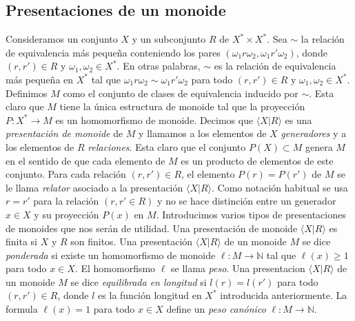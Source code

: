 \documentclass[12pt]{article}
\theoremstyle{definition}
\begin{document}
\subsection{Presentaciones de un monoide}
Consideramos un conjunto $X$ y un subconjunto $R$ de $X^*\times X^*$. Sea $\sim$ la relación de equivalencia más pequeña conteniendo los pares $(\omega_1r\omega_2, \omega_1r'\omega_2)$, donde $(r,r')\in R$ y $\omega_1,\omega_2\in X^*$. En otras palabras, $\sim$ es la relación de equivalencia más pequeña en $X^*$ tal que $\omega_1r\omega_2\sim\omega_1r'\omega_2$ para todo $(r,r')\in R$ y $\omega_1,\omega_2\in X^*$. Definimos $M$ como el conjunto de clases de equivalencia inducido por $\sim$. Esta claro que $M$ tiene la única estructura de monoide tal que la proyección $P:X^*\rightarrow M$ es un homomorfismo de monoide. Decimos que $\langle X|R\rangle$ es una \textit{presentación de monoide} de $M$ y llamamos a los elementos de $X$ \textit{generadores} y a los elementos de $R$ \textit{relaciones}.
\newline
\newline
Esta claro que el conjunto $P(X)\subset M$ genera $M$ en el sentido de que cada elemento de $M$ es un producto de elementos de este conjunto. Para cada relación $(r,r')\in R$, el elemento $P(r)=P(r')$ de $M$ se le llama \textit{relator} asociado a la presentación $\langle X|R\rangle$. Como notación habitual se usa $r=r'$ para la relación $(r,r'\in R)$ y no se hace distinción entre un generador $x\in X$ y su proyección $P(x)$ en $M$.
\newline
\newline
Introducimos varios tipos de presentaciones de monoides que nos serán de utilidad. Una presentación de monoide $\langle X|R\rangle$ es finita si $X$ y $R$ son finitos. Una presentación $\langle X|R\rangle$ de un monoide $M$ se dice \textit{ponderada} si existe un homomorfismo de monoide $\ell:M\rightarrow \mathbb{N}$ tal que $\ell(x)\geq 1$ para todo $x\in X$. El homomorfismo $\ell$ se llama \textit{peso}.
\newline
\newline
Una presentacion $\langle X|R\rangle$ de un monoide $M$ se dice \textit{equilibrada en longitud} si $l(r)=l(r')$ para todo $(r,r')\in R$, donde $l$ es la función longitud en $X^*$ introducida anteriormente. La formula $\ell(x)=1$ para todo $x\in X$ define un \textit{peso canónico} $\ell:M\rightarrow \mathbb{N}$.
\end{document}
